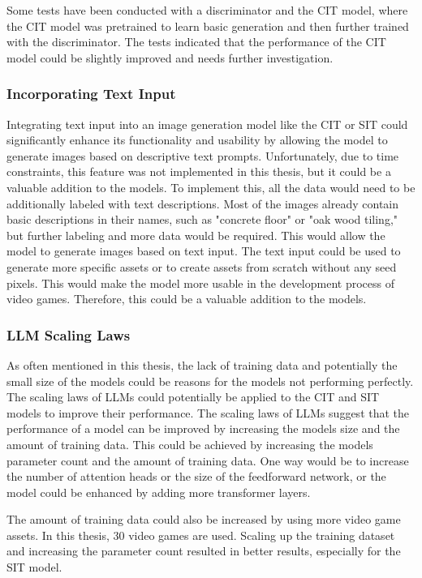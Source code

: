     Some tests have been conducted with a discriminator and the CIT model, where the CIT model was pretrained to learn basic generation and then further trained with the discriminator. The tests indicated that the performance of the CIT model could be slightly improved and needs further investigation.

    \subsubsection{Incorporating Text Input}

    Integrating text input into an image generation model like the CIT or SIT could significantly enhance its functionality and usability by allowing the model to generate images based on descriptive text prompts. Unfortunately, due to time constraints, this feature was not implemented in this thesis, but it could be a valuable addition to the models. To implement this, all the data would need to be additionally labeled with text descriptions. Most of the images already contain basic descriptions in their names, such as "concrete floor" or "oak wood tiling," but further labeling and more data would be required. This would allow the model to generate images based on text input. The text input could be used to generate more specific assets or to create assets from scratch without any seed pixels. This would make the model more usable in the development process of video games. Therefore, this could be a valuable addition to the models.

    \subsubsection{LLM Scaling Laws}

    As often mentioned in this thesis, the lack of training data and potentially the small size of the models could be reasons for the models not performing perfectly. The scaling laws of LLMs \autocite{kaplan2020scaling} could potentially be applied to the CIT and SIT models to improve their performance. The scaling laws of LLMs suggest that the performance of a model can be improved by increasing the models size and the amount of training data. This could be achieved by increasing the models parameter count and the amount of training data. One way would be to increase the number of attention heads or the size of the feedforward network, or the model could be enhanced by adding more transformer layers. 
    
    The amount of training data could also be increased by using more video game assets. In this thesis, 30 video games are used. Scaling up the training dataset and increasing the parameter count resulted in better results, especially for the SIT model.

